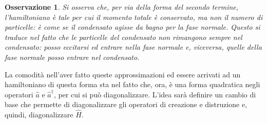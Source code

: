 \documentclass[11pt, a4paper]{scrartcl}
\theoremstyle{style}
\newtheorem{osservazione}{Osservazione}[section]
\theoremstyle{style1}
\numberwithin{equation}{subsection}
\begin{document}
\begin{osservazione}
Si osserva che, per via della forma del secondo termine, l'hamiltoniano \`e tale per cui il momento totale \`e conservato, ma non il numero di particelle: \`e come se il condensato agisse da bagno per la fase normale.
Questo si traduce nel fatto che le particelle del condensato non rimangono sempre nel condensato: posso eccitarsi ed entrare nella fase normale e, viceversa, quelle della fase normale posso entrare nel condensato.
\end{osservazione}
\noindent La comodit\`a nell'aver fatto queste approssimazioni ed essere arrivati ad un hamiltoniano di questa forma sta nel fatto che, ora, \`e una forma quadratica negli operatori $\hat{a}$ e $\hat{a}^\dagger $, per cui si pu\`o diagonalizzare.
L'idea sar\`a definire un cambio di base che permette di diagonalizzare gli operatori di creazione e distruzione e, quindi, diagonalizzare $\hat{H}$.
\end{document}

